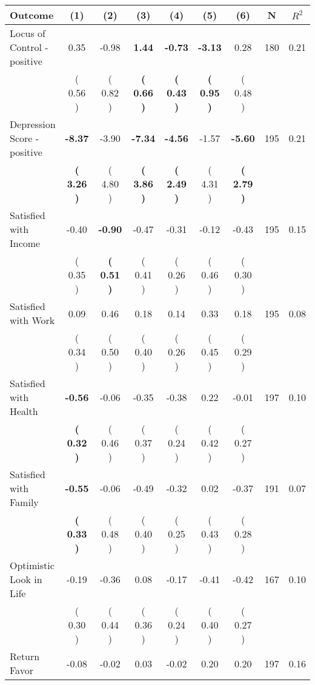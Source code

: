 \begin{tabular}{lcccccccc}
\toprule
 \textbf{Outcome} & \textbf{(1)} & \textbf{(2)} & \textbf{(3)} & \textbf{(4)} & \textbf{(5)} & \textbf{(6)} & \textbf{N} & \textbf{$ R^2$} \\
\midrule
Locus of Control - positive &      0.35 &     -0.98 & \textbf{     1.44} & \textbf{    -0.73} & \textbf{    -3.13} &      0.28 & 180 &       0.21 \\ 
 & (     0.56 ) & (     0.82 ) & \textbf{(     0.66 )} & \textbf{(     0.43 )} & \textbf{(     0.95 )} & (     0.48 ) & \\
Depression Score - positive & \textbf{    -8.37} &     -3.90 & \textbf{    -7.34} & \textbf{    -4.56} &     -1.57 & \textbf{    -5.60} & 195 &       0.21 \\ 
 & \textbf{(     3.26 )} & (     4.80 ) & \textbf{(     3.86 )} & \textbf{(     2.49 )} & (     4.31 ) & \textbf{(     2.79 )} & \\
Satisfied with Income &     -0.40 & \textbf{    -0.90} &     -0.47 &     -0.31 &     -0.12 &     -0.43 & 195 &       0.15 \\ 
 & (     0.35 ) & \textbf{(     0.51 )} & (     0.41 ) & (     0.26 ) & (     0.46 ) & (     0.30 ) & \\
Satisfied with Work &      0.09 &      0.46 &      0.18 &      0.14 &      0.33 &      0.18 & 195 &       0.08 \\ 
 & (     0.34 ) & (     0.50 ) & (     0.40 ) & (     0.26 ) & (     0.45 ) & (     0.29 ) & \\
Satisfied with Health & \textbf{    -0.56} &     -0.06 &     -0.35 &     -0.38 &      0.22 &     -0.01 & 197 &       0.10 \\ 
 & \textbf{(     0.32 )} & (     0.46 ) & (     0.37 ) & (     0.24 ) & (     0.42 ) & (     0.27 ) & \\
Satisfied with Family & \textbf{    -0.55} &     -0.06 &     -0.49 &     -0.32 &      0.02 &     -0.37 & 191 &       0.07 \\ 
 & \textbf{(     0.33 )} & (     0.48 ) & (     0.40 ) & (     0.25 ) & (     0.43 ) & (     0.28 ) & \\
Optimistic Look in Life &     -0.19 &     -0.36 &      0.08 &     -0.17 &     -0.41 &     -0.42 & 167 &       0.10 \\ 
 & (     0.30 ) & (     0.44 ) & (     0.36 ) & (     0.24 ) & (     0.40 ) & (     0.27 ) & \\
Return Favor &     -0.08 &     -0.02 &      0.03 &     -0.02 &      0.20 &      0.20 & 197 &       0.16 \\ 

\end{tabular}
